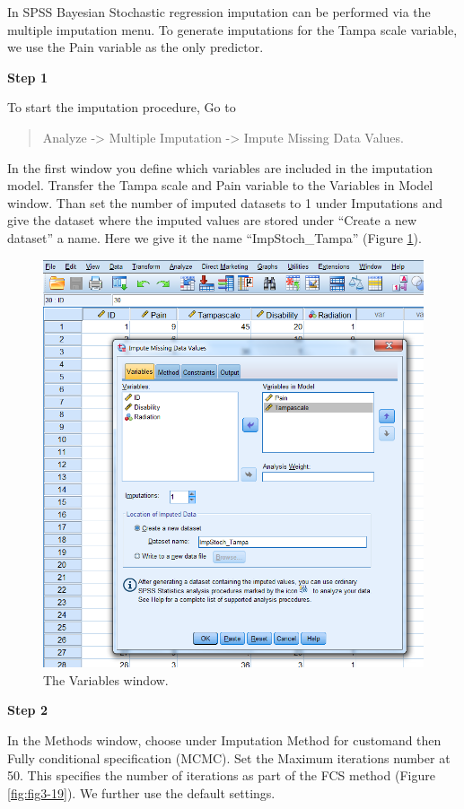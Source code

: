 \documentclass[]{book}
\begin{document}
In SPSS Bayesian Stochastic regression imputation can be performed via
the multiple imputation menu. To generate imputations for the Tampa
scale variable, we use the Pain variable as the only predictor.

\textbf{Step 1}

To start the imputation procedure, Go to

\begin{quote}
Analyze -\textgreater{} Multiple Imputation -\textgreater{} Impute
Missing Data Values.
\end{quote}

In the first window you define which variables are included in the
imputation model. Transfer the Tampa scale and Pain variable to the
Variables in Model window. Than set the number of imputed datasets to 1
under Imputations and give the dataset where the imputed values are
stored under ``Create a new dataset'' a name. Here we give it the name
``ImpStoch\_Tampa'' (Figure \ref{fig:fig3-18}).

\begin{figure}

{\centering \includegraphics[width=0.7\linewidth]{images/fig3.18} 

}

\caption{The Variables window.}\label{fig:fig3-18}
\end{figure}

\textbf{Step 2}

In the Methods window, choose under Imputation Method for customand then
Fully conditional specification (MCMC). Set the Maximum iterations
number at 50. This specifies the number of iterations as part of the FCS
method (Figure \ref{fig:fig3-19}). We further use the default settings.
\end{document}
